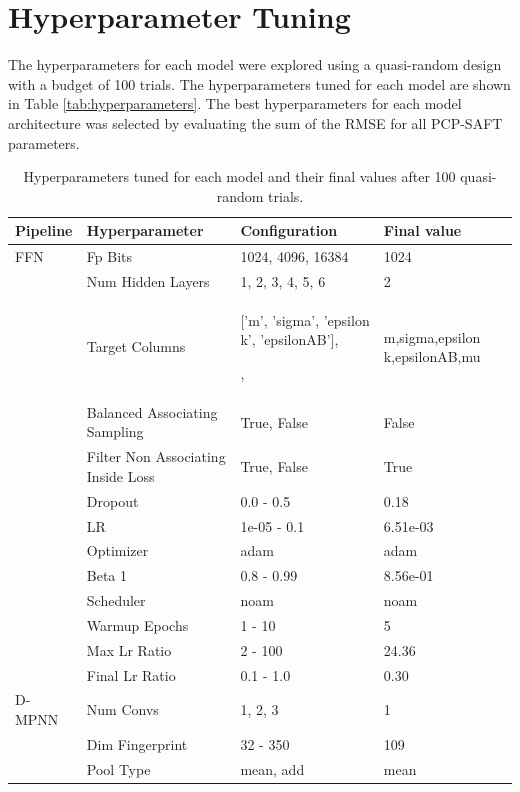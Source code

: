 \section{Hyperparameter Tuning}

The hyperparameters for each model were explored using a quasi-random design \cite{Bosquet2017} with a budget of 100 trials. The hyperparameters tuned for each model are shown in Table \ref{tab:hyperparameters}. The best hyperparameters for each model architecture was selected by evaluating the sum of the RMSE for all PCP-SAFT parameters.

\begin{table}
	\caption{Hyperparameters tuned for each model and their final values after 100 quasi-random trials.}
        \tiny
	\begin{center}
		\begin{tabular}{lp{}p{}l}
			Pipeline & Hyperparameter & Configuration & Final value \\
			\hline
			FFN & Fp Bits & 1024, 4096, 16384 & 1024 \\
			 & Num Hidden Layers & 1, 2, 3, 4, 5, 6 & 2 \\
			 & Target Columns & ['m', 'sigma', 'epsilon k', 'epsilonAB'],\par['m', 'sigma', 'epsilon k', 'epsilonAB', 'KAB'],\par['m', 'sigma', 'epsilon k', 'epsilonAB', 'mu'] & m,sigma,epsilon k,epsilonAB,mu \\
			 & Balanced Associating Sampling & True, False & False \\
			 & Filter Non Associating Inside Loss & True, False & True \\
			 & Dropout & 0.0 - 0.5 & 0.18 \\
			 & LR & 1e-05 - 0.1 & 6.51e-03 \\
			 & Optimizer & adam & adam \\
			 & Beta 1 & 0.8 - 0.99 & 8.56e-01 \\
			 & Scheduler & noam & noam \\
			 & Warmup Epochs & 1 - 10 & 5 \\
			 & Max Lr Ratio & 2 - 100 & 24.36 \\
			 & Final Lr Ratio & 0.1 - 1.0 & 0.30 \\
			D-MPNN & Num Convs & 1, 2, 3 & 1 \\
			 & Dim Fingerprint & 32 - 350 & 109 \\
			 & Pool Type & mean, add & mean \\

\end{tabular}
\end{center}
\end{table}
